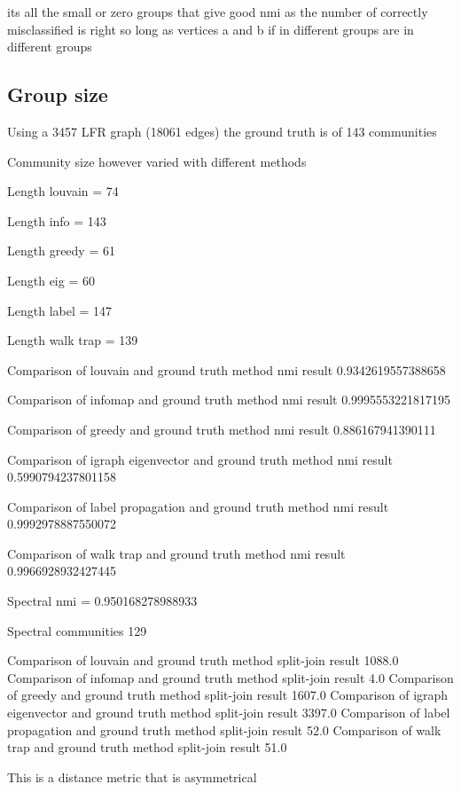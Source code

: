 

its all the small or zero groups that give good nmi as the number of correctly misclassified is right so long as vertices a and b if in different groups are in different groups 

\subsection{Group size}

Using a 3457 LFR graph (18061 edges) the ground truth is of 143 communities

Community size however varied with different methods

Length louvain = 74

 Length info = 143
 
 Length greedy = 61
 
 Length eig = 60
 
 Length label = 147
 
 Length walk trap = 139
 
 Comparison of louvain and ground truth method nmi result 0.9342619557388658
 
Comparison of infomap and ground truth method nmi result 0.9995553221817195

Comparison of greedy and ground truth method nmi result 0.886167941390111

Comparison of igraph eigenvector and ground truth method nmi result 0.5990794237801158

Comparison of label propagation and ground truth method nmi result 0.9992978887550072

Comparison of walk trap and ground truth method nmi result 0.9966928932427445

Spectral nmi = 0.950168278988933

Spectral communities 129

Comparison of louvain and ground truth method split-join result 1088.0
Comparison of infomap and ground truth method split-join result 4.0
Comparison of greedy and ground truth method split-join result 1607.0
Comparison of igraph eigenvector and ground truth method split-join result 3397.0
Comparison of label propagation and ground truth method split-join result 52.0
Comparison of walk trap and ground truth method split-join result 51.0

This is a distance metric that is asymmetrical

